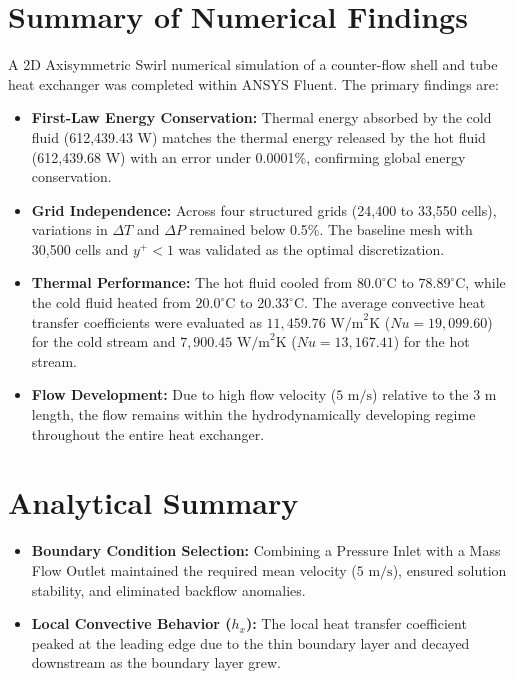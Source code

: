 \documentclass[12pt,a4paper]{report}
\begin{document}
\section{Summary of Numerical Findings}
A 2D Axisymmetric Swirl numerical simulation of a counter-flow shell and tube heat exchanger was completed within ANSYS Fluent. The primary findings are:
\begin{itemize}
    \item \textbf{First-Law Energy Conservation:} Thermal energy absorbed by the cold fluid (612,439.43 W) matches the thermal energy released by the hot fluid (612,439.68 W) with an error under 0.0001\%, confirming global energy conservation.
    \item \textbf{Grid Independence:} Across four structured grids (24,400 to 33,550 cells), variations in $\Delta T$ and $\Delta P$ remained below 0.5\%. The baseline mesh with 30,500 cells and $y^+ < 1$ was validated as the optimal discretization.
    \item \textbf{Thermal Performance:} The hot fluid cooled from $80.0^\circ\text{C}$ to $78.89^\circ\text{C}$, while the cold fluid heated from $20.0^\circ\text{C}$ to $20.33^\circ\text{C}$. The average convective heat transfer coefficients were evaluated as $11{,}459.76\text{ W/m}^2\text{K}$ ($Nu = 19{,}099.60$) for the cold stream and $7{,}900.45\text{ W/m}^2\text{K}$ ($Nu = 13{,}167.41$) for the hot stream.
    \item \textbf{Flow Development:} Due to high flow velocity ($5\text{ m/s}$) relative to the 3 m length, the flow remains within the hydrodynamically developing regime throughout the entire heat exchanger.
\end{itemize}

\section{Analytical Summary}
\begin{itemize}
    \item \textbf{Boundary Condition Selection:} Combining a Pressure Inlet with a Mass Flow Outlet maintained the required mean velocity ($5\text{ m/s}$), ensured solution stability, and eliminated backflow anomalies.
    \item \textbf{Local Convective Behavior ($h_x$):} The local heat transfer coefficient peaked at the leading edge due to the thin boundary layer and decayed downstream as the boundary layer grew.
\end{itemize}
\end{document}
